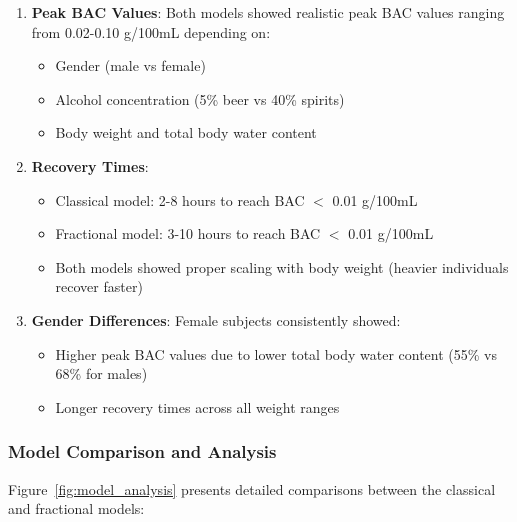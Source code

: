 \documentclass[11pt]{article}
\begin{document}
\begin{enumerate}
    \item \textbf{Peak BAC Values}: Both models showed realistic peak BAC values ranging from 0.02-0.10 g/100mL depending on:
    \begin{itemize}
        \item Gender (male vs female)
        \item Alcohol concentration (5\% beer vs 40\% spirits)
        \item Body weight and total body water content
    \end{itemize}
    
    \item \textbf{Recovery Times}: 
    \begin{itemize}
        \item Classical model: 2-8 hours to reach BAC $<$ 0.01 g/100mL
        \item Fractional model: 3-10 hours to reach BAC $<$ 0.01 g/100mL
        \item Both models showed proper scaling with body weight (heavier individuals recover faster)
    \end{itemize}
    
    \item \textbf{Gender Differences}: Female subjects consistently showed:
    \begin{itemize}
        \item Higher peak BAC values due to lower total body water content (55\% vs 68\% for males)
        \item Longer recovery times across all weight ranges
    \end{itemize}
\end{enumerate}

\subsubsection{Model Comparison and Analysis}

Figure~\ref{fig:model_analysis} presents detailed comparisons between the classical and fractional models:
\end{document}
